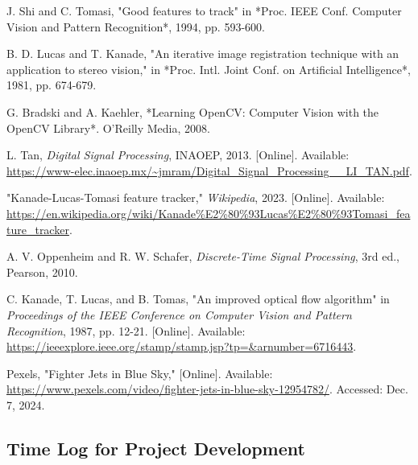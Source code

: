 \documentclass[11pt, conference, letterpaper]{IEEEtran}
\begin{document}
\begin{thebibliography}{1}

    J. Shi and C. Tomasi, "Good features to track" in *Proc. IEEE Conf. Computer Vision and Pattern Recognition*, 1994, pp. 593-600.
    
    B. D. Lucas and T. Kanade, "An iterative image registration technique with an application to stereo vision," in *Proc. Intl. Joint Conf. on Artificial Intelligence*, 1981, pp. 674-679.
    
    G. Bradski and A. Kaehler, *Learning OpenCV: Computer Vision with the OpenCV Library*. O'Reilly Media, 2008.
    
    L. Tan, \textit{Digital Signal Processing}, INAOEP, 2013. [Online]. Available: \url{https://www-elec.inaoep.mx/~jmram/Digital_Signal_Processing__LI_TAN.pdf}.
    
    "Kanade-Lucas-Tomasi feature tracker," \textit{Wikipedia}, 2023. [Online]. Available: \url{https://en.wikipedia.org/wiki/Kanade%E2%80%93Lucas%E2%80%93Tomasi_feature_tracker}.
    
    A. V. Oppenheim and R. W. Schafer, \textit{Discrete-Time Signal Processing}, 3rd ed., Pearson, 2010.
    
    C. Kanade, T. Lucas, and B. Tomas, "An improved optical flow algorithm" in \textit{Proceedings of the IEEE Conference on Computer Vision and Pattern Recognition}, 1987, pp. 12-21. [Online]. Available: \url{https://ieeexplore.ieee.org/stamp/stamp.jsp?tp=&arnumber=6716443}.
    
    Pexels, "Fighter Jets in Blue Sky," [Online]. Available: \url{https://www.pexels.com/video/fighter-jets-in-blue-sky-12954782/}. Accessed: Dec. 7, 2024.

\end{thebibliography}


\newpage

\onecolumn
\appendix
\subsection{Time Log for Project Development}
\end{document}
